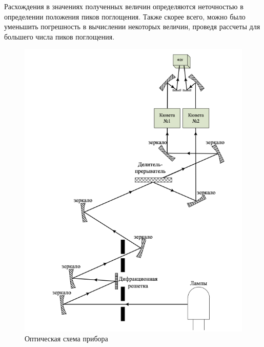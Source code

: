 \documentclass{article}
\begin{document}
Расхождения в значениях полученных величин определяются неточностью в определении положения пиков поглощения. Также скорее всего, можно было уменьшить погрешность в вычислении некоторых величин, проведя рассчеты для большего числа пиков поглощения.
\newpage
\begin{figure}[h!]
    \centering
    \includegraphics[scale=0.55]{Screenshot 2024-02-12 at 10.10.01 AM.png}
    \caption{Оптическая схема прибора}
    \label{fig:ustanovka}
\end{figure}
\newpage
\end{document}
